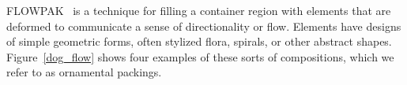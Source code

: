 \newtext
{
FLOWPAK~\cite{Saputra2017} is a technique for filling a container 
region with elements that are deformed 
to communicate a sense of directionality or flow.
Elements have designs of simple geometric forms, often stylized flora, spirals, or other abstract shapes. 
Figure~\ref{dog_flow} shows four examples of these sorts of compositions, which we refer to as ornamental packings.
}








